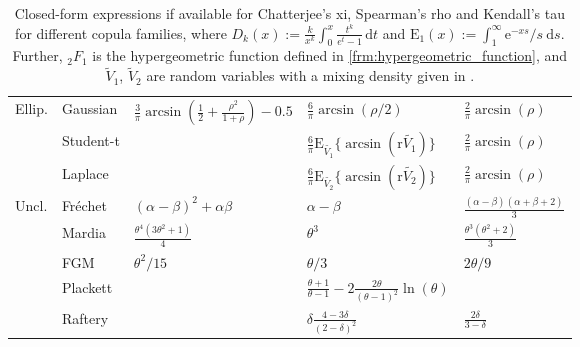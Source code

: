\documentclass{article}
\newcommand{\de}{\mathrm{\,d}}
\begin{document}
\begin{table}[tbp]
\begin{center}
{\begin{tabular}{lllll}
            \midrule
            Ellip. & Gaussian & $\frac{3}{\pi} \arcsin \left(\frac{1}{2}+\frac{\rho^2}{1+\rho}\right)-0.5$ & $\frac6{\pi}\arcsin(\rho/2)$ & $\frac2{\pi}\arcsin(\rho)$ \\
            & Student-t &  & $\frac{6}{\pi} \mathrm{E}_{\tilde{V_1}}\{\arcsin (\mathrm{r} \tilde{V_1})\}$ & $\frac2{\pi}\arcsin(\rho)$ \\
            & Laplace &  & $\frac{6}{\pi} \mathrm{E}_{\tilde{V_2}}\{\arcsin (\mathrm{r} \tilde{V_2})\}$ & $\frac2{\pi}\arcsin(\rho)$ \\
            \midrule
            Uncl. & Fréchet & $(\alpha - \beta)^2 + \alpha \beta$ & $\alpha-\beta$ & $\frac{(\alpha-\beta)(\alpha+\beta+2)}{3}$ \\
            & Mardia & $\frac{\theta^{4} \left(3 \theta^{2} + 1\right)}{4}$ & $\theta^3$ & $\frac{\theta^{3} \left(\theta^{2} + 2\right)}{3}$ \\
            & FGM & $\theta^2/15$ & $\theta/3$ & $2\theta/9$\\
            & Plackett &  & $\frac{\theta + 1}{\theta - 1} - 2\frac{2\theta}{(\theta-1)^2}\ln(\theta)$ & \\
            & Raftery & & $\delta\frac{4-3\delta}{(2-\delta)^2}$ & $\frac{2\delta}{3-\delta}$ \\
            \bottomrule
        \end{tabular}
        }
    \caption{
        Closed-form expressions if available for Chatterjee's xi, Spearman's rho and Kendall's tau for different copula families, where
        $D_k(x) := \frac{k}{x^k} \int_0^x \frac{t^k}{e^t-1}\de t$ and $\mathrm{E}_1(x):=\int_1^{\infty} \mathrm{e}^{-x s} / s \mathrm{~d} s$.
        Further, ${}_2F_1$ is the hypergeometric function defined in \eqref{frm:hypergeometric_function}, and $\tilde{V}_1$, $\tilde{V}_2$ are random variables with a mixing density given in \cite[Proposition 1]{heinen2020spearman}.
    }
    \label{tab:all_families_rho_and_tau}
\end{center}
\end{table}
\end{document}
